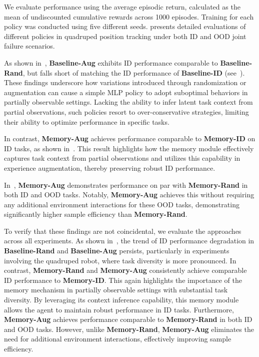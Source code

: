 We evaluate performance using the average episodic return, calculated as the mean of undiscounted cumulative rewards across 1000 episodes.
Training for each policy was conducted using five different seeds.
 presents detailed evaluations of different policies in quadruped position tracking under both ID and OOD joint failure scenarios. 

As shown in~, \textbf{Baseline-Aug} exhibits ID performance comparable to \textbf{Baseline-Rand}, but falls short of matching the ID performance of \textbf{Baseline-ID} (see~).
These findings underscore how variations introduced through randomization or augmentation can cause a simple MLP policy to adopt suboptimal behaviors in partially observable settings.
Lacking the ability to infer latent task context from partial observations, such policies resort to over-conservative strategies, limiting their ability to optimize performance in specific tasks.

In contrast, \textbf{Memory-Aug} achieves performance comparable to \textbf{Memory-ID} on ID tasks, as shown in~.
This result highlights how the memory module effectively captures task context from partial observations and utilizes this capability in experience augmentation, thereby preserving robust ID performance.

In~, \textbf{Memory-Aug} demonstrates performance on par with \textbf{Memory-Rand} in both ID and OOD tasks.
Notably, \textbf{Memory-Aug} achieves this without requiring any additional environment interactions for these OOD tasks, demonstrating significantly higher sample efficiency than \textbf{Memory-Rand}.

To verify that these findings are not coincidental, we evaluate the approaches across all experiments.
As shown in~, the trend of ID performance degradation in \textbf{Baseline-Rand} and \textbf{Baseline-Aug} persists, particularly in experiments involving the quadruped robot, where task diversity is more pronounced.
In contrast, \textbf{Memory-Rand} and \textbf{Memory-Aug} consistently achieve comparable ID performance to \textbf{Memory-ID}.
This again highlights the importance of the memory mechanism in partially observable settings with substantial task diversity.
By leveraging its context inference capability, this memory module allows the agent to maintain robust performance in ID tasks.
Furthermore, \textbf{Memory-Aug} achieves performance comparable to \textbf{Memory-Rand} in both ID and OOD tasks.
However, unlike \textbf{Memory-Rand}, \textbf{Memory-Aug} eliminates the need for additional environment interactions, effectively improving sample efficiency.

